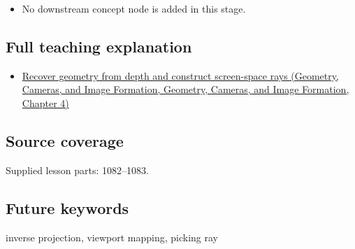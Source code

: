 \begin{itemize}
\tightlist
\item
  No downstream concept node is added in this stage.
\end{itemize}

\subsection{Full teaching explanation}\label{appendix-f1a6d43e80d1-full-teaching-explanation}

\begin{itemize}
\tightlist
\item
  \href{../03-Geometry-Cameras-and-Image-Formation/main.pdf\#nameddest=02-foundations-ii-ch035-recover-geometry-from-depth-and-construct-screen-space-rays}{Recover geometry from depth and construct screen-space rays (Geometry, Cameras, and Image Formation, Geometry, Cameras, and Image Formation, Chapter 4)}
\end{itemize}

\subsection{Source coverage}\label{appendix-f1a6d43e80d1-source-coverage}

Supplied lesson parts: 1082--1083.

\subsection{Future keywords}\label{appendix-f1a6d43e80d1-future-keywords}

inverse projection, viewport mapping, picking ray
